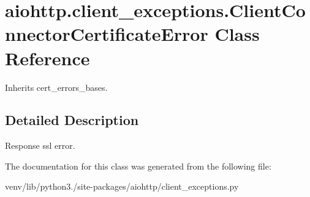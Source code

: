 \hypertarget{classaiohttp_1_1client__exceptions_1_1_client_connector_certificate_error}{}\section{aiohttp.\+client\+\_\+exceptions.\+Client\+Connector\+Certificate\+Error Class Reference}
\label{classaiohttp_1_1client__exceptions_1_1_client_connector_certificate_error}


Inherits cert\+\_\+errors\+\_\+bases.



\subsection{Detailed Description}
\begin{DoxyVerb}Response ssl error.\end{DoxyVerb}
 

The documentation for this class was generated from the following file\+:\begin{DoxyCompactItemize}
\item 
venv/lib/python3./site-\/packages/aiohttp/client\+\_\+exceptions.\+py\end{DoxyCompactItemize}
